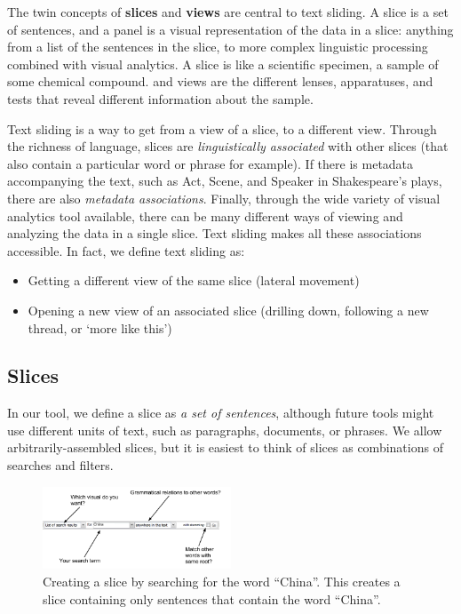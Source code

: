 \documentclass{sig-alternate}
\newcommand{\strong}[1] {\textbf{#1}}
\begin{document}
The twin concepts of \strong{slices} and \strong{views} are central to text sliding. A slice is a set of sentences, and a panel is a visual representation of the data in a slice: anything from a list of the sentences in the slice, to more complex linguistic processing combined with visual analytics.  A slice is like a scientific specimen, a sample of some chemical compound. and views are the different lenses, apparatuses, and tests that reveal different information about the sample.

Text sliding is a way to get from a view of a slice, to a different view. Through the richness of language, slices are \emph{linguistically associated} with other slices (that also contain a particular word or phrase for example). If there is metadata accompanying the text, such as Act, Scene, and Speaker in Shakespeare's plays, there are also \emph{metadata associations}. Finally,  through the wide variety of visual analytics tool available, there can be many different ways of viewing and analyzing the data in a single slice. Text sliding makes all these associations accessible. 
 In fact, we define text sliding as:
\begin{itemize}
	\item Getting a different view of the same slice (lateral movement)
	\item Opening a new view of an associated slice (drilling down, following a new thread, or `more like this')
\end{itemize}

\subsection{Slices}
In our tool, we define a slice as \emph{a set of sentences}, although future tools might use different units of text, such as paragraphs, documents, or phrases. We allow arbitrarily-assembled slices, but it is easiest to think of slices as combinations of searches and filters.  

\begin{figure}[ht!]
\begin{center}
	\includegraphics[width=0.5\textwidth]{fig/intro/03b.png}
\end{center}
    \caption{%
        Creating a slice by searching for the word ``China''. This creates a slice containing only sentences that contain the word ``China''. \label{fig:intro03}
     }%
\end{figure}
\end{document}
